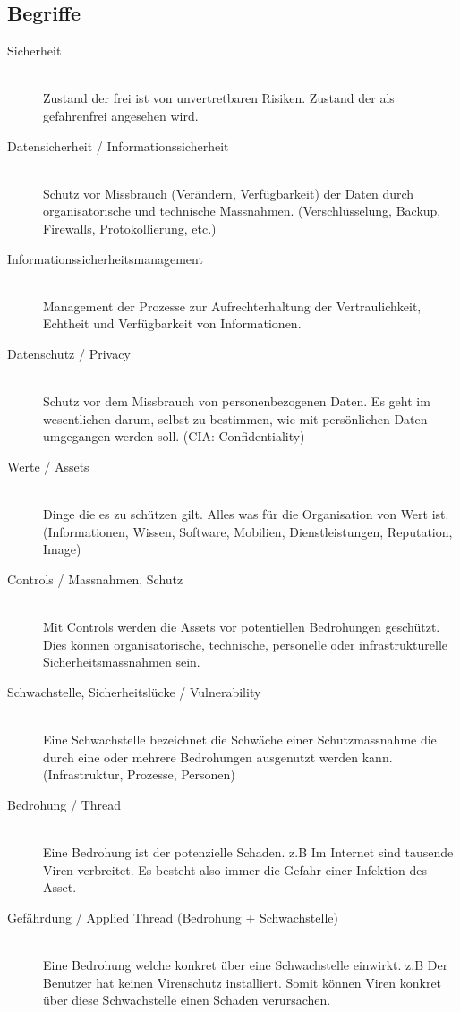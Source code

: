 \subsection{Begriffe}
\begin{description}
    \item[Sicherheit] \hfill \\
    Zustand der frei ist von unvertretbaren Risiken. Zustand der als gefahrenfrei angesehen wird.
	\item[Datensicherheit / Informationssicherheit] \hfill \\
	Schutz vor Missbrauch (Verändern, Verfügbarkeit) der Daten durch organisatorische und technische Massnahmen. (Verschlüsselung, Backup, Firewalls, Protokollierung, etc.)
	\item[Informationssicherheitsmanagement] \hfill \\
	Management der Prozesse zur Aufrechterhaltung der Vertraulichkeit, Echtheit und Verfügbarkeit von Informationen.
	\item[Datenschutz / Privacy] \hfill \\
	Schutz vor dem Missbrauch von personenbezogenen Daten. Es geht im wesentlichen darum, selbst zu bestimmen, wie mit persönlichen Daten umgegangen werden soll. (CIA: Confidentiality)
	\item[Werte / Assets] \hfill \\
	Dinge die es zu schützen gilt. Alles was für die Organisation von Wert ist. (Informationen, Wissen, Software, Mobilien, Dienstleistungen, Reputation, Image)
	\item[Controls / Massnahmen, Schutz] \hfill \\
	Mit Controls werden die Assets vor potentiellen Bedrohungen geschützt. Dies können organisatorische, technische, personelle oder infrastrukturelle Sicherheitsmassnahmen sein.
	\item [Schwachstelle, Sicherheitslücke / Vulnerability] \hfill \\
	Eine Schwachstelle bezeichnet die Schwäche einer Schutzmassnahme die durch eine oder mehrere Bedrohungen ausgenutzt werden kann. (Infrastruktur, Prozesse, Personen)
	\item[Bedrohung / Thread] \hfill \\
	Eine Bedrohung ist der potenzielle Schaden. z.B Im Internet sind tausende Viren verbreitet. Es besteht also immer die Gefahr einer Infektion des Asset.
	\item[Gefährdung / Applied Thread (Bedrohung + Schwachstelle)] \hfill \\
	Eine Bedrohung welche konkret über eine Schwachstelle einwirkt. z.B Der Benutzer hat keinen Virenschutz installiert. Somit können Viren konkret über diese Schwachstelle einen Schaden verursachen. 
\end{description}
